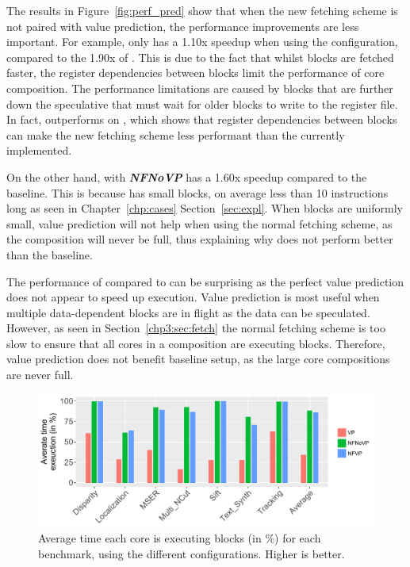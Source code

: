 The results in Figure~\ref{fig:perf_pred} show that when the new fetching scheme is not paired with value prediction, the performance improvements are less important.
For example,  only has a 1.10x speedup when using the \nfnovp{} configuration, compared to the 1.90x of \nfvp{}.
This is due to the fact that whilst blocks are fetched faster, the register dependencies between blocks limit the performance of core composition.
The performance limitations are caused by blocks that are further down the speculative that must wait for older blocks to write to the register file.
In fact, \vp{} outperforms \nfnovp{} on , which shows that register dependencies between blocks can make the new fetching scheme less performant than the currently implemented.

On the other hand,  with \textbf{\textit{NFNoVP}} has a 1.60x speedup compared to the baseline.
This is because  has small blocks, on average less than 10 instructions long as seen in Chapter~\ref{chp:cases} Section~\ref{sec:expl}.
When blocks are uniformly small, value prediction will not help when using the normal fetching scheme, as the composition will never be full, thus explaining why \vp{} does not perform better than the baseline.

The performance of \vp{} compared to \novp{} can be surprising as the perfect value prediction does not appear to speed up execution.
Value prediction is most useful when multiple data-dependent blocks are in flight as the data can be speculated.
However, as seen in Section~\ref{chp3:sec:fetch} the normal fetching scheme is too slow to ensure that all cores in a composition are executing blocks.
Therefore, value prediction does not benefit baseline setup, as the large core compositions are never full.

\begin{figure}[t]
    \centering
    \includegraphics[width=1\textwidth]{chapter3/graphics/perf_av_cycle_exec2.pdf}
    \caption{Average time each core is executing blocks (in \%) for each benchmark, using the different configurations. Higher is better.}
    \label{fig:perf_av_cycle}
	\vspace{1em}
\end{figure}


